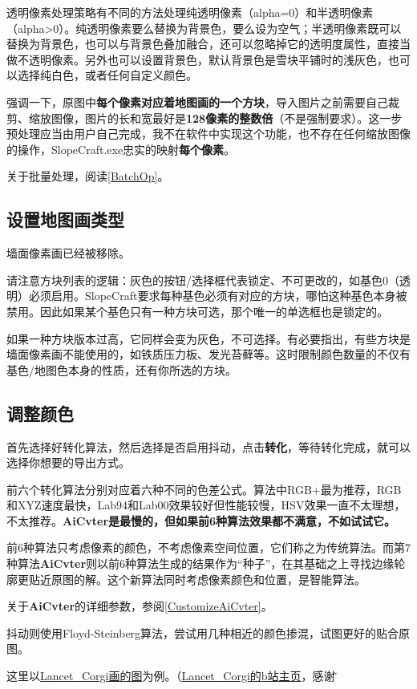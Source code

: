 \documentclass[UTF8]{ctexart}
\begin{document}
透明像素处理策略有不同的方法处理纯透明像素（alpha=0）和半透明像素（alpha>0）。纯透明像素要么替换为背景色，要么设为空气；半透明像素既可以替换为背景色，也可以与背景色叠加融合，还可以忽略掉它的透明度属性，直接当做不透明像素。另外也可以设置背景色，默认背景色是雪块平铺时的浅灰色，也可以选择纯白色，或者任何自定义颜色。

强调一下，原图中\textbf{每个像素对应着地图画的一个方块}，导入图片之前需要自己裁剪、缩放图像，图片的长和宽最好是\textbf{128像素的整数倍}（不是强制要求）。这一步预处理应当由用户自己完成，我不在软件中实现这个功能，也不存在任何缩放图像的操作，SlopeCraft.exe忠实的映射\textbf{每个像素}。

关于批量处理，阅读\ref{BatchOp}。

\subsection{设置地图画类型}
墙面像素画已经被移除。

请注意方块列表的逻辑：灰色的按钮/选择框代表锁定、不可更改的，如基色0（透明）必须启用。SlopeCraft要求每种基色必须有对应的方块，哪怕这种基色本身被禁用。因此如果某个基色只有一种方块可选，那个唯一的单选框也是锁定的。

如果一种方块版本过高，它同样会变为灰色，不可选择。有必要指出，有些方块是墙面像素画不能使用的，如铁质压力板、发光苔藓等。这时限制颜色数量的不仅有基色/地图色本身的性质，还有你所选的方块。

\subsection{调整颜色}

首先选择好转化算法，然后选择是否启用抖动，点击\textbf{转化}，等待转化完成，就可以选择你想要的导出方式。

前六个转化算法分别对应着六种不同的色差公式。算法中RGB+最为推荐，RGB和XYZ速度最快，Lab94和Lab00效果较好但性能较慢，HSV效果一直不太理想，不太推荐。\textbf{AiCvter是最慢的，但如果前6种算法效果都不满意，不如试试它。}

前6种算法只考虑像素的颜色，不考虑像素空间位置，它们称之为传统算法。而第7种算法\textbf{AiCvter}则以前6种算法生成的结果作为“种子”，在其基础之上寻找边缘轮廓更贴近原图的解。这个新算法同时考虑像素颜色和位置，是智能算法。

关于\textbf{AiCvter}的详细参数，参阅\ref{CustomizeAiCvter}。

抖动则使用Floyd-Steinberg算法，尝试用几种相近的颜色掺混，试图更好的贴合原图。

这里以\href{https://t.bilibili.com/544583492149793294}{Lancet\_Corgi画的图}为例。（\href{https://space.bilibili.com/37171000}{Lancet\_Corgi的b站主页}，感谢\~）
\end{document}
